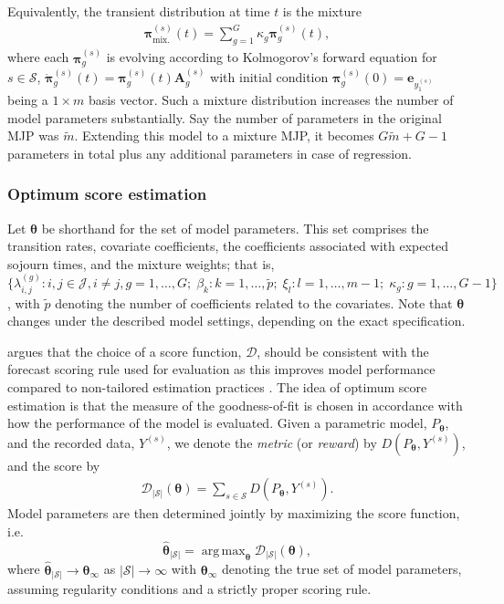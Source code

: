 \documentclass{article}
\DeclareMathOperator*{\argmax}{arg\,max}
\begin{document}
Equivalently, the transient distribution at time $t$ is the mixture
\begin{align}
\bm\pi_{\text{mix.}}^{(s)}(t) = \sum_{g = 1}^G \kappa_g \bm\pi_g^{(s)}(t), \label{eq:mixture}
\end{align}
where each $\bm\pi_g^{(s)}$ is evolving according to Kolmogorov's forward equation for $s \in \mathcal S$, $\Dot{\bm{\pi}}_g^{(s)}(t) = \bm{\pi}_g^{(s)}(t) \bm{A}^{(s)}_g$ with initial condition $\bm \pi_g^{(s)}(0) = \bm e_{y_1^{(s)}}$ being a $1\times m$ basis vector.
Such a mixture distribution increases the number of model parameters substantially. Say the number of parameters in the original MJP was $\widetilde{m}$. Extending this model to a mixture MJP, it becomes $G \widetilde{m} + G-1$ parameters in total plus any additional parameters in case of regression. 





\subsubsection{Optimum score estimation}\label{sec:optimum_score_estimation}

Let $\bm{\theta}$ be shorthand for the set of model parameters. This set comprises the transition rates, covariate coefficients, the coefficients associated with expected sojourn times, and the mixture weights; that is, $\{ \lambda_{i,j}^{(g)} : i,j \in \mathcal{J}, i \neq j, g=1,\dots,G ; \; \beta_k : k = 1,\dots, \widetilde{p} ; \; \xi_l : l = 1, \dots, m-1 ;  \; \kappa_g : g=1,\dots,G-1\} $, with $\widetilde{p}$ denoting the number of coefficients related to the covariates. Note that $\bm{\theta}$ changes under the described model settings, depending on the exact specification.


\citet{Gneiting2007} argues that the choice of a score function, $\mathcal{D}$, should be consistent with the forecast scoring rule used for evaluation as this improves model performance compared to non-tailored estimation practices \citep{friedman1983a,Copas1983}. 
The idea of optimum score estimation is that the measure of the goodness-of-fit is chosen in accordance with how the performance of the model is evaluated. 
Given a parametric model, $P_{\bm{\theta}}$, and the recorded data, $Y^{(s)}$, we denote the \textit{metric} (or \textit{reward}) by $D(P_{\bm{\theta}}, Y^{(s)})$, and the score by
\begin{align}
    \mathcal{D}_{|\mathcal{S}|}(\bm{\theta}) = \sum_{s \in \mathcal{S}} D\left(P_{\bm{\theta}}, Y^{(s)}\right). \label{eq:mean_score}
\end{align}
Model parameters are then determined jointly by maximizing the score function, i.e.
$$\widehat{\bm{\theta}}_{|\mathcal{S}|} = \argmax_{\bm{\theta}}\mathcal{D}_{|\mathcal{S}|}(\bm{\theta}), $$
where $\widehat{\bm{\theta}}_{|\mathcal{S}|}  \rightarrow \bm{\theta}_{\infty}$ as $|\mathcal{S}| \rightarrow \infty$ with $\bm{\theta}_{\infty}$ denoting the true set of model parameters, assuming regularity conditions and a strictly proper scoring rule.
\end{document}
